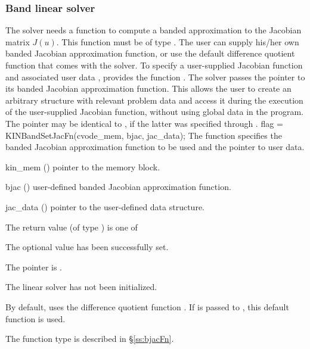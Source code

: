 \subsubsection{Band linear solver}\label{sss:optin_band}
The 
{\kindense} solver needs a function to compute a banded approximation to
the Jacobian matrix $J(u)$.  This function must be of type . 
The user can supply his/her own banded Jacobian approximation function, 
or use the default difference quotient function  
that comes with the {\kinband} solver.
To specify a user-supplied Jacobian function  and associated user 
data , {\kinband} provides the function .
The {\kinband} solver passes the pointer 
to its banded Jacobian approximation function. This allows the user to
create an arbitrary structure with relevant problem data and access it
during the execution of the user-supplied Jacobian function, without
using global data in the program.  The pointer  may be
identical to , if the latter was specified through .
{
  flag = KINBandSetJacFn(cvode\_mem, bjac, jac\_data);
}
{
  The function  specifies the banded Jacobian
  approximation function to be used and the pointer to user data.
}
{
  \begin{args}
  \item[kin\_mem] ()
    pointer to the {\kinsol} memory block.
  \item[bjac] ()
    user-defined banded Jacobian approximation function.
  \item[jac\_data] ()
    pointer to the user-defined data structure.
  \end{args}
}
{
  The return value  (of type ) is one of
  \begin{args}
  \item[\Id{KINBAND\_SUCCESS}] 
    The optional value has been successfully set.
  \item[\Id{KINBAND\_MEM\_NULL}]
    The  pointer is .
  \item[\Id{KINBAND\_LMEM\_NULL}]
    The {\kinband} linear solver has not been initialized.
  \end{args}
}
{
  By default, {\kinband} uses the difference quotient function .
  If  is passed to , this default function is used.

  The function type  is described in \S\ref{ss:bjacFn}.
}

